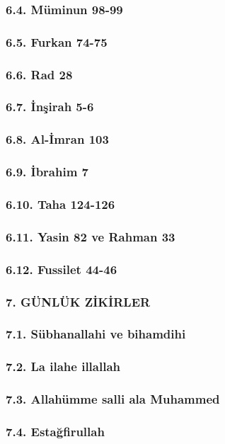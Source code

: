 \documentclass[12pt,a4paper]{article}
\begin{document}
\subsubsection{6.4. Müminun 98-99}
\subsubsection{6.5. Furkan 74-75}
\subsubsection{6.6. Rad 28}
\subsubsection{6.7. İnşirah 5-6}
\subsubsection{6.8. Al-İmran 103}
\subsubsection{6.9. İbrahim 7}
\subsubsection{6.10. Taha 124-126}
\subsubsection{6.11. Yasin 82 ve Rahman 33}
\subsubsection{6.12. Fussilet 44-46}
\subsubsection{7. GÜNLÜK ZİKİRLER}
\subsubsection{7.1. Sübhanallahi ve bihamdihi}
\subsubsection{7.2. La ilahe illallah}
\subsubsection{7.3. Allahümme salli ala Muhammed}
\subsubsection{7.4. Estağfirullah}
\end{document}
